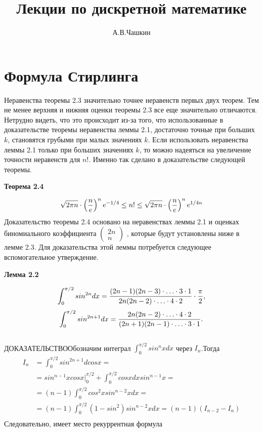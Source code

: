 \documentclass[12pt]{article}
\date{}
\author{А.В.Чашкин}
\title{\bf Лекции по дискретной математике }
\begin{document}
\maketitle
\newpage
\tableofcontents  
\newpage

\section { Формула Стирлинга }
Неравенства теоремы 2.3 значительно точнее неравенств первых двух теорем. Тем не менее верхняя и нижняя оценки теоремы 2.3 все еще значительно отличаются. Нетрудно видеть, что это происходит из-за того, что использованные в доказательстве теоремы неравенства леммы 2.1, достаточно точные при больших $k$, становятся грубыми при малых значениях $k$.
Если использовать неравенства леммы 2.1 только при больших значениях $k$, то можно надеяться на увеличение точности неравенств для $n!$. Именно так сделано в доказательстве следующей теоремы.\\
\begin{flushleft}
\large \bf{Теорема 2.4}
\end{flushleft}
\begin{equation}
\sqrt{2\pi n}\cdot \left(\frac{n}{e}\right)^n e^{-1/4}\le n!\le \sqrt{2\pi n}\cdot \left(\frac{n}{e}\right)^n e^{1/4n} \notag
\end{equation}
  Доказательство теоремы 2.4 основано на неравенствах леммы 2.1 и оценках биномиального коэффициента $\begin{pmatrix} 2n\\n \end{pmatrix}$ , которые будут установлены ниже в лемме 2.3. Для доказательства этой леммы потребуется следующее вспомогательное утверждение.
\begin{flushleft}
\large \bf{Лемма 2.2}
\end{flushleft}
\begin{equation}
  \int_0^{\pi/2}{sin^{2n}d x}= \frac{(2n-1)(2n-3) \cdot \ldots \cdot 3 \cdot 1}{2n(2n-2) \cdot \ldots  \cdot 4 \cdot 2} \cdot \frac{\pi}{2},  \notag
\end{equation}
\begin{equation}
    \int_0^{\pi/2}{sin^{2n+1}d x}= \frac{2n(2n-2) \cdot \ldots \cdot 4 \cdot 2}{(2n+1)(2n-1) \cdot \ldots \cdot 3 \cdot 1}.\notag
\end{equation}\\
\textsc{ДОКАЗАТЕЛЬСТВО}\text{ }Обозначим интеграл $\int_0^{\pi/2}{sin^n x d x}$ через $I_n$.Тогда 
\begin{align*}
        I_n&=\int_0^{\pi/2}{sin^{2n+1}d cos x}=\\
        &= sin^{n-1}x cos{x}\bigl|_0^{\pi/2}+\int_0^{\pi/2}{cos{x}d x}sin^{n-1}x=\\ &= (n-1)\int_0^{\pi/2}{cos^2{x}sin^{n-2}{x}d x}=\\ &= (n-1)\int_0^{\pi/2}{(1-sin^2)sin^{n-2}{x}d x}=(n-1)(I_{n-2}-I_n)\\ 
\end{align*} Следовательно, имеет место рекуррентная формула
\end{document}
